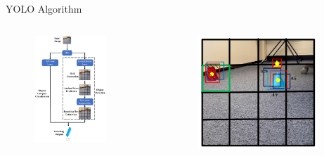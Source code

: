\documentclass[10pt]{beamer}
\begin{document}
\begin{frame}{YOLO Algorithm}
\begin{columns}
\begin{figure}
    \centering
    \includegraphics[width=0.78\textwidth]{Images/YOLO.png}
\end{figure}
\begin{figure}
    \centering
    \includegraphics[width=0.9\textwidth]{Images/IOU.png}
\end{figure} 
\end{columns}
\end{frame}
\end{document}
